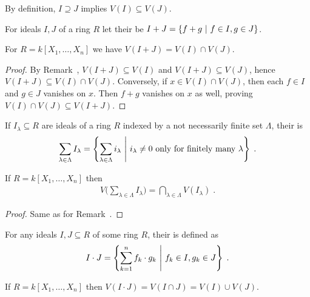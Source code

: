 \documentclass[a4paper,parskip=half,numbers=enddot, DIV=12]{scrreprt}
\begin{document}
	\begin{rem}
		By definition, $I\supseteq J$ implies $V(I)\subseteq V(J)$.
	\end{rem}
	\begin{defi}
		For ideals $I,J$ of a ring $R$ let their  be $I+J =\left\{f+g\ \middle|\  f\in I, g\in J\right\}$.
	\end{defi}
	\begin{rem}
		For $R=k[X_1,\ldots,X_n]$ we have $V(I+J) = V(I)\cap V(J)$.
	\end{rem}
	\begin{proof}
		By Remark~, $V(I+J)\subseteq V(I)$ and $V(I+J)\subseteq V(J)$, hence $V(I+J)\subseteq V(I)\cap V(J)$. Conversely, if $x\in V(I)\cap V(J)$, then each $f\in I$ and $g\in J$ vanishes on $x$. Then $f+g$ vanishes on $x$ as well, proving $V(I)\cap V(J)\subseteq V(I+J)$.
	\end{proof}
	\begin{defi}
		If $I_\lambda\subseteq R$ are ideals of a ring $R$ indexed by a not necessarily finite set $\Lambda$, their  is
		\begin{align*}
		\sum_{\lambda\in\Lambda}I_\lambda = \left\{\sum_{\lambda\in\Lambda} i_\lambda \ \middle|\  i_\lambda \neq 0 \text{ only for finitely many }\lambda\right\}\;.
		\end{align*}
		
	\end{defi}
	\begin{rem}
		If $R=k[X_1,\ldots,X_n]$ then 
		\begin{align*}
		V\bigg(\sum_{\lambda\in \Lambda} I_\lambda\bigg) = \bigcap_{\lambda\in\Lambda} V(I_\lambda)\;.
		\end{align*}
	\end{rem}
	\begin{proof}
		Same as for Remark~.
	\end{proof}
	\begin{defi}
		For any ideals $I,J\subseteq R$ of some ring $R$, their  is defined as
		\begin{align*}
		I\cdot J = \left\{\sum_{k=1}^n f_k\cdot g_k\ \middle|\  f_k\in I, g_k\in J\right\}\;.
		\end{align*}
		
	\end{defi}
	\begin{rem}
		If $R=k[X_1,\ldots,X_n]$ then $V(I\cdot J) = V(I\cap J) = V(I)\cup V(J)$.
	\end{rem}
\end{document}
